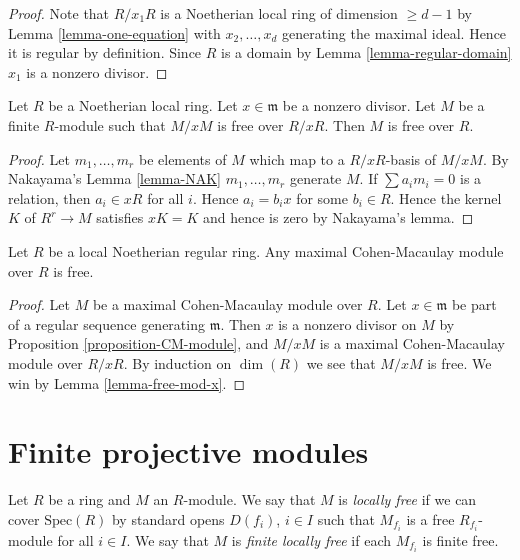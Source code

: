 \begin{proof}
Note that $R/x_1R$ is a Noetherian local ring of dimension $\geq d - 1$
by Lemma \ref{lemma-one-equation} with $x_2,\ldots,x_d$
generating the maximal ideal. Hence it is regular by definition.
Since $R$ is a domain by Lemma \ref{lemma-regular-domain}
$x_1$ is a nonzero divisor.
\end{proof}

\begin{lemma}
\label{lemma-free-mod-x}
Let $R$ be a Noetherian local ring.
Let $x \in \mathfrak m$ be a nonzero divisor.
Let $M$ be a finite $R$-module such that 
$M/xM$ is free over $R/xR$.
Then $M$ is free over $R$.
\end{lemma}

\begin{proof}
Let $m_1,\ldots,m_r$ be elements of $M$ which map to
a $R/xR$-basis of $M/xM$. By Nakayama's Lemma \ref{lemma-NAK}
$m_1,\ldots,m_r$ generate $M$. If $\sum a_i m_i = 0$
is a relation, then $a_i \in xR$ for all $i$. Hence
$a_i = b_i x$ for some $b_i \in R$. Hence
the kernel $K$ of $R^r \to M$ satisfies $xK = K$
and hence is zero by Nakayama's lemma.
\end{proof}

\begin{lemma}
\label{lemma-regular-mcm-free}
Let $R$ be a local Noetherian regular ring.
Any maximal Cohen-Macaulay module over $R$ is
free.
\end{lemma}

\begin{proof}
Let $M$ be a maximal Cohen-Macaulay module over $R$.
Let $x \in \mathfrak m$ be part of a regular sequence
generating $\mathfrak m$. Then $x$ is a nonzero divisor
on $M$ by Proposition \ref{proposition-CM-module}, and
$M/xM$ is a maximal Cohen-Macaulay module over $R/xR$.
By induction on $\dim(R)$ we see that $M/xM$ is free.
We win by Lemma \ref{lemma-free-mod-x}.
\end{proof}








\section{Finite projective modules}
\label{section-finite-projective-modules}

\begin{definition}
\label{definition-locally-free}
Let $R$ be a ring and $M$ an $R$-module.
We say that $M$ is {\it locally free} if 
we can cover $\text{Spec}(R)$ by standard
opens $D(f_i)$, $i \in I$ such that $M_{f_i}$
is a free $R_{f_i}$-module for all $i \in I$.
We say that $M$ is {\it finite locally free} if
each $M_{f_i}$ is finite free.
\end{definition}

